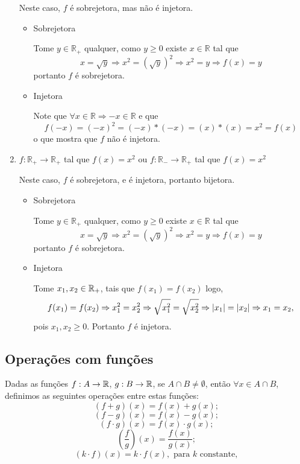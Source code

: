 \begin{exem}
\begin{enumerate}
  Neste caso, $f$ é sobrejetora, mas não é injetora.

  \begin{dem}
   \begin{itemize}
    \item Sobrejetora

    Tome $y \in \mathbb{R_{+}}$ qualquer, como $y \geq 0$ existe $x \in \mathbb{R}$ tal que
    \[x = \sqrt{y} \Rightarrow x^2 = (\sqrt{y})^2 \Rightarrow x^2 = y \Rightarrow f(x) = y \]
    portanto $f$ é sobrejetora.
    \fim
    \item Injetora

    Note que $ \forall x \in \mathbb{R} \Rightarrow -x \in \mathbb{R}$ e que
    \[f(-x)= (-x)^2 = (-x)*(-x) = (x)*(x) = x^2 = f(x)\]
    o que mostra que $f$ não é injetora.

   \end{itemize}
  \end{dem}

  \item $f: \mathbb{R_{+}} \rightarrow \mathbb{R_{+}}$ tal que $f(x) = x^2$ ou $f: \mathbb{R_{-}} \rightarrow \mathbb{R_{+}}$ tal que $f(x) = x^2$

  Neste caso, $f$ é sobrejetora, e é injetora, portanto bijetora.

  \begin{dem}
   \begin{itemize}
    \item Sobrejetora

    Tome $y \in \mathbb{R_{+}}$ qualquer, como $y \geq 0$ existe $x \in \mathbb{R}$ tal que
    \[x = \sqrt{y} \Rightarrow x^2 = (\sqrt{y})^2 \Rightarrow x^2 = y \Rightarrow f(x) = y\]
    portanto $f$ é sobrejetora.
    \fim
    \item Injetora

    Tome $x_1, x_2 \in \mathbb{R}_{+}$, tais que $f(x_1) = f(x_2)$ logo,
    \[f(x_1) = f(x_2) \Rightarrow x_1^2= x_2^2 \Rightarrow \sqrt{x_1^2}= \sqrt{x_2^2} \Rightarrow \left|x_1\right|= \left|x_2\right| \Rightarrow x_1= x_2, \]
    pois $x_1, x_2 \geqslant 0$. Portanto $f$ é injetora.

   \end{itemize}
  \end{dem}

 \end{enumerate}

\end{exem}

\subsection{Operações com funções}
Dadas as funções $f: A \rightarrow \mathbb{R}$, $g: B \rightarrow \mathbb{R}$, se $A \cap B \neq \emptyset$, então $\forall x \in A \cap B$, definimos as seguintes operações entre estas funções:
\[(f + g)(x)= f(x) + g(x); \]
\[(f - g)(x)= f(x) - g(x); \]
\[(f \cdot g)(x)= f(x) \cdot g(x); \]
\[ \left( \frac{f}{g} \right) (x)= \frac{f(x)}{g(x)} ;\]
\[(k \cdot f)(x)= k \cdot f(x), \text{ para } k \text{ constante} ,\]

